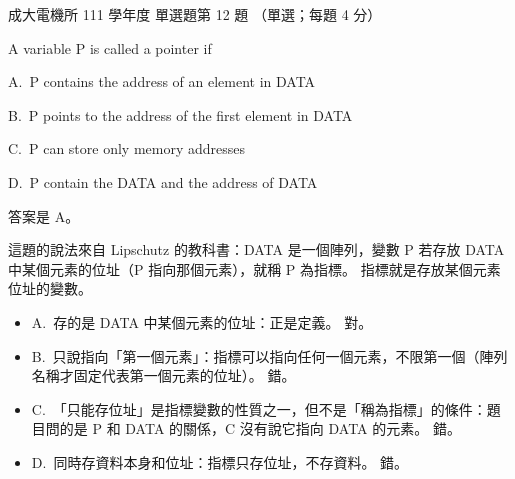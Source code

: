 \begin{pastexam}[label={px:ncku-111-ee-ds-12}]{成大電機所 111 學年度 單選題第 12 題}
（單選；每題 4 分）

A variable P is called a pointer if

A.~P contains the address of an element in DATA

B.~P points to the address of the first element in DATA

C.~P can store only memory addresses

D.~P contain the DATA and the address of DATA
\end{pastexam}

\begin{pastsoln}
答案是 A。

這題的說法來自 Lipschutz 的教科書：DATA 是一個陣列，變數 P 若存放 DATA 中某個元素的位址（P 指向那個元素），就稱 P 為指標。 指標就是存放某個元素位址的變數。
\begin{itemize}
\item A.~存的是 DATA 中某個元素的位址：正是定義。 對。
\item B.~只說指向「第一個元素」：指標可以指向任何一個元素，不限第一個（陣列名稱才固定代表第一個元素的位址）。 錯。
\item C.~「只能存位址」是指標變數的性質之一，但不是「稱為指標」的條件：題目問的是 P 和 DATA 的關係，C 沒有說它指向
DATA 的元素。 錯。
\item D.~同時存資料本身和位址：指標只存位址，不存資料。 錯。
\end{itemize}
\end{pastsoln}
